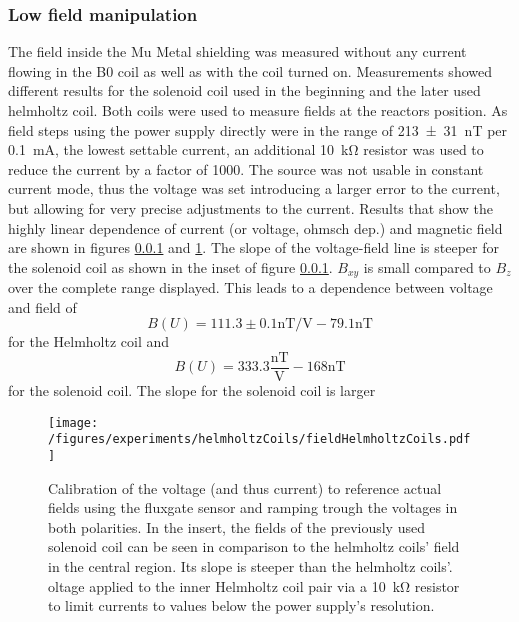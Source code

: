         \subsubsection{Low field manipulation}
            The field inside the Mu Metal shielding was measured without any current flowing in the B0 coil as well as with the coil turned on. Measurements showed different results for the solenoid coil used in the beginning and the later used helmholtz coil. Both coils were used to measure fields at the reactors position. As field steps using the power supply directly were in the range of \SI{213\pm 31}{\nano\tesla} per \SI{0.1}{\milli\ampere}, the lowest settable current, an additional \SI{10}{\kilo\ohm} resistor was used to reduce the current by a factor of 1000. The source was not usable in constant current mode, thus the voltage was set introducing a larger error to the current, but allowing for very precise adjustments to the current. Results that show the highly linear dependence of current (or voltage, ohmsch dep.) and magnetic field are shown in figures \ref{} and \ref{figures:results:helmholtzCoilsCenterField}. The slope of the voltage-field line is steeper for the solenoid coil as shown in the inset of figure \ref{}. $B_{xy}$ is small compared to $B_z$ over the complete range displayed. This leads to a dependence between voltage and field of
            \begin{equation}
                B(U) = 111.3\pm 0.1 \si{\nano\tesla\per\volt} - 79.1 \si{\nano\tesla}
            \end{equation}
            for the Helmholtz coil and
            \begin{equation}
                B(U) = 333.3 \frac{\si{\nano\tesla}}{\si{\volt}} - 168 \si{\nano\tesla}
            \end{equation}
            for the solenoid coil. The slope for the solenoid coil is larger 
                \begin{figure}
                    \centering
                    \label{figures:results:helmholtzCoilsCenterField}
                    \texttt{[image: /figures/experiments/helmholtzCoils/fieldHelmholtzCoils.pdf]}
                    \caption[Helmholtz fields]{Calibration of the voltage (and thus current) to reference actual fields using the fluxgate sensor and ramping trough the voltages in both polarities. In the insert, the fields of the previously used solenoid coil can be seen in comparison to the helmholtz coils' field in the central region. Its slope is steeper than the helmholtz coils'. oltage applied to the inner Helmholtz coil pair via a \SI{10}{\kilo\ohm} resistor to limit currents to values below the power supply's resolution.}
                \end{figure}
